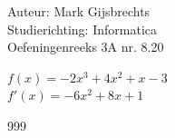 \documentclass[a4paper]{article}
\begin{document}
\noindent \large Auteur: Mark Gijsbrechts \\
\noindent \large Studierichting: Informatica\\
\noindent \large Oefeningenreeks 3A nr. 8.20\\

\medskip

\normalsize





$f(x) = -2x^3 + 4x^2 + x - 3 $ \\

$f'(x) = -6x^2 +8x + 1 $


\begin{thebibliography}{999}
\end{thebibliography}
\end{document}
